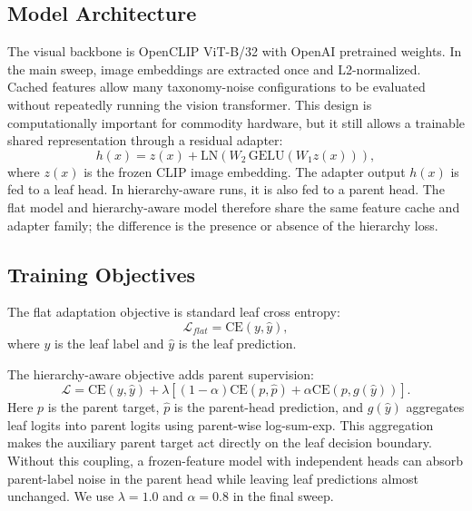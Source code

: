 \documentclass[runningheads]{llncs}
\begin{document}
\subsection{Model Architecture}
The visual backbone is OpenCLIP ViT-B/32 with OpenAI pretrained weights. In the
main sweep, image embeddings are extracted once and L2-normalized. Cached
features allow many taxonomy-noise configurations to be evaluated without
repeatedly running the vision transformer. This design is computationally
important for commodity hardware, but it still allows a trainable shared
representation through a residual adapter:
\begin{equation}
h(x) = z(x) + \mathrm{LN}(W_2\,\mathrm{GELU}(W_1z(x))),
\end{equation}
where $z(x)$ is the frozen CLIP image embedding. The adapter output $h(x)$ is
fed to a leaf head. In hierarchy-aware runs, it is also fed to a parent head.
The flat model and hierarchy-aware model therefore share the same feature
cache and adapter family; the difference is the presence or absence of the
hierarchy loss.

\subsection{Training Objectives}
The flat adaptation objective is standard leaf cross entropy:
\begin{equation}
\mathcal{L}_{flat} = \mathrm{CE}(y,\hat{y}),
\end{equation}
where $y$ is the leaf label and $\hat{y}$ is the leaf prediction.

The hierarchy-aware objective adds parent supervision:
\begin{equation}
\mathcal{L} =
\mathrm{CE}(y,\hat{y}) +
\lambda\left[(1-\alpha)\mathrm{CE}(p,\hat{p}) +
\alpha\mathrm{CE}(p,g(\hat{y}))\right].
\end{equation}
Here $p$ is the parent target, $\hat{p}$ is the parent-head prediction, and
$g(\hat{y})$ aggregates leaf logits into parent logits using parent-wise
log-sum-exp. This aggregation makes the auxiliary parent target act directly
on the leaf decision boundary. Without this coupling, a frozen-feature model
with independent heads can absorb parent-label noise in the parent head while
leaving leaf predictions almost unchanged. We use $\lambda=1.0$ and
$\alpha=0.8$ in the final sweep.
\end{document}
